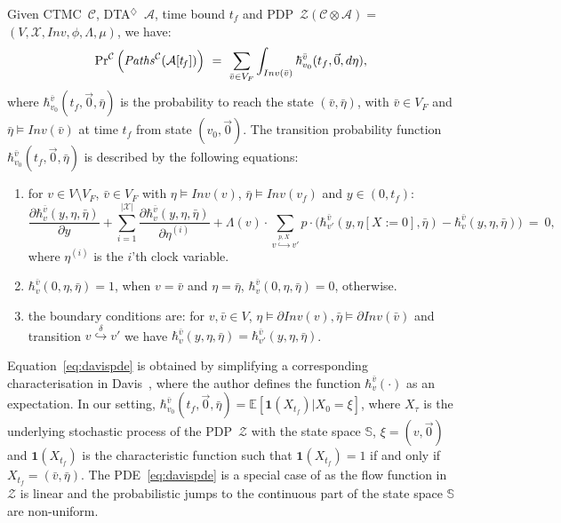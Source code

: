 \documentclass{LMCS}
\newcommand{\mc}[1]{\mathcal{#1}}
\newcommand{\mb}{\mathbb}
\newcommand{\<}{\langle}
\renewcommand{\>}{\rangle}
\newcommand{\CTMC}{\textsc{{CTMC}}}
\newcommand{\DTA}{\textsc{DTA}}
\newcommand{\DTAr}{\DTA$^{\!\Ever}$}
\newcommand{\PDP}{\textsc{PDP}}
\newcommand{\Paths}{{\it Paths}}
\newcommand{\F}{\mathop{\diamondsuit}}
\newcommand{\Inv}{\mathit{Inv}}
\newcommand{\Ever}{\F}
\begin{document}
Given \CTMC\ $\mc{C}$, \DTAr\ $\mc{A}$, time bound $t_f$ and \PDP\ $\mc{Z}(\mc{C}\otimes\mc{A})=$ $(V,\mc{X},\Inv,\phi,\Lambda, \mu)$, we have:
$$
{\Pr}^{\mc{C}}\left(\Paths^{\mc{C}}(\mc{A}[t_{\!f}])\right) \ = \
\sum_{\bar v\in V_F}\int_{Inv(\bar v)}\hbar_{v_0}^{\bar v}(t_f,\vec{0},d\eta),
$$
where $\hbar_{v_0}^{\bar v}(t_f,\vec{0},\bar\eta)$ is the probability to reach the state
$(\bar v,\bar\eta)$, with $\bar v\in V_F$ and $\bar\eta\models Inv(\bar v)$ at time $t_f$
from state $(v_0,\vec{0})$.
The transition probability function $\hbar_{v_0}^{\bar v}(t_f,\vec{0},\bar\eta)$ is described
by the following equations:
\begin{enumerate}[$\bullet$]
\item
for $v\in V\setminus V_F$, $\bar v\in V_F$ with $\eta\models \Inv(v)$,
$\bar\eta\models \Inv(v_f)$ and $y\in(0,t_{\!f})$:
\begin{equation}\label{eq:davispde}
\frac{\partial\hbar_{v}^{\bar v}(y,\eta,\bar\eta)}{\partial
y}+\sum_{i=1}^{|\mc{X}|}
\frac{\partial\hbar_{v}^{\bar v}(y,\eta,\bar\eta)}{\partial\eta^{(i)}}+
\Lambda(v){\cdot}\!\!\sum_{v\stackrel{p,X}{\hookrightarrow}v'}p{\cdot}
\big(\hbar_{v'}^{\bar v}(y,\eta[X:=0],\bar\eta)-\hbar_{v}^{\bar
v}(y,\eta,\bar\eta)\big) \ = \ 0,
\end{equation}
where $\eta^{(i)}$ is the $i$'th clock variable.
\item
$\hbar_{v}^{\bar v}(0,\eta,\bar\eta)=1$, when $v=\bar v$ and $\eta=\bar\eta$,
$\hbar_{v}^{\bar v}(0,\eta,\bar\eta)=0$, otherwise.
\item the boundary conditions are:
for $v,\bar v\in V$, $\eta\models\partial \Inv(v),\bar\eta\models\partial
\Inv(\bar v)$ and transition $v\stackrel{\delta}{\hookrightarrow}v'$
we have $\hbar_v^{\bar v}(y,\eta,\bar\eta)=\hbar_{v'}^{\bar
v}(y,\eta,\bar\eta)$.
\end{enumerate}
Equation~\eqref{eq:davispde} is obtained by simplifying a corresponding characterisation in
Davis~\cite{Dav93}, where the author defines the function $\hbar_{v}^{\bar v}(\cdot)$ as an
expectation.
In our setting, $\hbar_{v_0}^{\bar v}(t_f,\vec{0},\bar\eta) = \mb{E}[\mathbf{1}(X_{t_f})\vert
X_0=\xi]$, where $X_\tau$ is the underlying stochastic process of the \PDP\ $\mc{Z}$ with
the state space $\mb{S}$, $\xi = (v,\vec{0})$ and $\mathbf{1}(X_{t_f})$ is the characteristic
function such that $\mathbf{1}(X_{t_f}) =1$ if and only if $X_{t_f}=(\bar v,\bar\eta)$.
The PDE~\eqref{eq:davispde} is a special case of \cite{Dav93} as the flow function in $\mc{Z}$
is linear and the probabilistic jumps to the continuous part of the state space $\mb{S}$ are
non-uniform.
\end{document}
